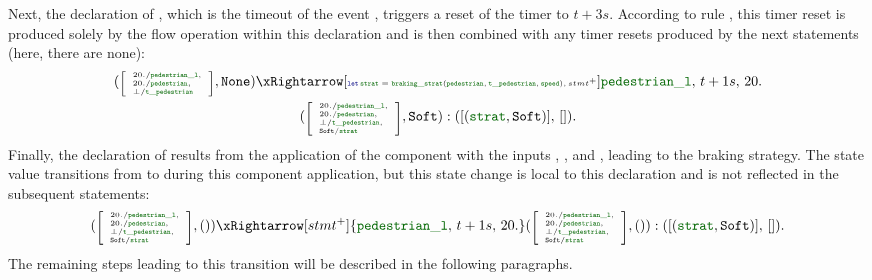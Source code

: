 %
Next, the declaration of , which is the timeout of the event ,
triggers a reset of the timer  to $t+3s$. According to rule
, this timer reset is produced solely by the flow
operation within this declaration and is then combined with any timer resets produced by the next
statements (here, there are none):
\begin{multline*}
    (\mathtiny{\left[\begin{array}{l}
                20./\idf{pedestrian\_l}, \\
                20./\idf{pedestrian},    \\
                \bot/\idf{t\_pedestrian}
            \end{array}\right]}, \No)
    \xRightarrow[\mathtiny{
            \decl{\idf{strat}}{\idf{braking\_strat}(\idf{pedestrian}, \idf{t\_pedestrian}, \idf{speed})},
            stmt^+
        }]{\idf{pedestrian\_l}, \, t+1s, \, 20.} \\
    (\mathtiny{\left[\begin{array}{l}
                20./\idf{pedestrian\_l},  \\
                20./\idf{pedestrian},     \\
                \bot/\idf{t\_pedestrian}, \\
                \Soft/\idf{strat}
            \end{array}\right]}, \Soft):
    ([(\idf{strat}, \Soft)], \, []).
\end{multline*}
%
Finally, the declaration of  results from the application of the component
 with the inputs , , and , leading
to the \Soft braking strategy. The state value transitions from \No to \Soft during this component
application, but this state change is local to this declaration and is not reflected in the
subsequent statements:
\begin{equation*}
    (\mathtiny{\left[\begin{array}{l}
                20./\idf{pedestrian\_l},  \\
                20./\idf{pedestrian},     \\
                \bot/\idf{t\_pedestrian}, \\
                \Soft/\idf{strat}
            \end{array}\right]}, ())
    \xRightarrow[stmt^+]{\idf{pedestrian\_l}, \, t+1s, \, 20.}
    (\mathtiny{\left[\begin{array}{l}
                20./\idf{pedestrian\_l},  \\
                20./\idf{pedestrian},     \\
                \bot/\idf{t\_pedestrian}, \\
                \Soft/\idf{strat}
            \end{array}\right]}, ()):
    ([(\idf{strat}, \Soft)], \, []).
\end{equation*}
%
The remaining steps leading to this transition will be described in the following paragraphs.


